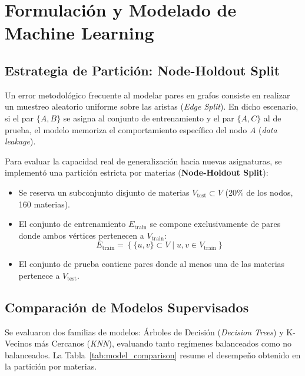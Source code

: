 \documentclass[11pt,a4paper]{article}
\begin{document}
\section{Formulación y Modelado de Machine Learning}

\subsection{Estrategia de Partición: Node-Holdout Split}
Un error metodológico frecuente al modelar pares en grafos consiste en realizar un muestreo aleatorio uniforme sobre las aristas (\textit{Edge Split}). En dicho escenario, si el par $\{A, B\}$ se asigna al conjunto de entrenamiento y el par $\{A, C\}$ al de prueba, el modelo memoriza el comportamiento específico del nodo $A$ (\textit{data leakage}).

Para evaluar la capacidad real de generalización hacia nuevas asignaturas, se implementó una partición estricta por materias (\textbf{Node-Holdout Split}):
\begin{itemize}
    \item Se reserva un subconjunto disjunto de materias $V_{\text{test}} \subset V$ (20\% de los nodos, 160 materias).
    \item El conjunto de entrenamiento $E_{\text{train}}$ se compone exclusivamente de pares donde ambos vértices pertenecen a $V_{\text{train}}$:
    \begin{equation}
        E_{\text{train}} = \left\{ \{u, v\} \subset V \mid u, v \in V_{\text{train}} \right\}
    \end{equation}
    \item El conjunto de prueba contiene pares donde al menos una de las materias pertenece a $V_{\text{test}}$.
\end{itemize}

\subsection{Comparación de Modelos Supervisados}
Se evaluaron dos familias de modelos: Árboles de Decisión (\textit{Decision Trees}) y K-Vecinos más Cercanos (\textit{KNN}), evaluando tanto regímenes balanceados como no balanceados. La Tabla~\ref{tab:model_comparison} resume el desempeño obtenido en la partición por materias.
\end{document}
